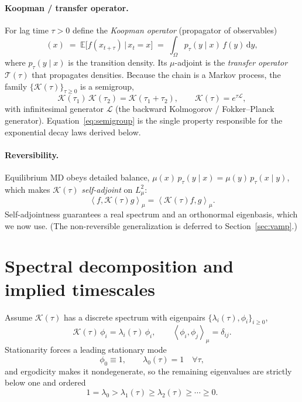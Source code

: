 \documentclass[11pt]{article}
\theoremstyle{plain}
\theoremstyle{definition}
\newcommand{\Kop}{\mathcal{K}}
\newcommand{\Lop}{\mathcal{L}}
\newcommand{\Top}{\mathcal{T}}
\newcommand{\inner}[2]{\left\langle #1 , #2 \right\rangle_{\mu}}
\newcommand{\E}{\mathbb{E}}
\newcommand{\dd}{\,\mathrm{d}}
\begin{document}
\paragraph{Koopman / transfer operator.}
For lag time $\tau>0$ define the \emph{Koopman operator} (propagator of observables)
\begin{equation}
[\Kop(\tau)f](x)\;=\;\E\!\big[f(x_{t+\tau})\,\big|\,x_t=x\big]
\;=\;\int_\Omega p_\tau(y\mid x)\,f(y)\dd y ,
\label{eq:koopman}
\end{equation}
where $p_\tau(y\mid x)$ is the transition density. Its $\mu$-adjoint is the
\emph{transfer operator} $\Top(\tau)$ that propagates densities. Because the chain
is a Markov process, the family $\{\Kop(\tau)\}_{\tau\ge0}$ is a semigroup,
\begin{equation}
\Kop(\tau_1)\,\Kop(\tau_2)=\Kop(\tau_1+\tau_2),
\qquad \Kop(\tau)=e^{\tau\Lop},
\label{eq:semigroup}
\end{equation}
with infinitesimal generator $\Lop$ (the backward Kolmogorov / Fokker--Planck
generator). Equation~\eqref{eq:semigroup} is the single property responsible for the
exponential decay laws derived below.

\paragraph{Reversibility.}
Equilibrium MD obeys detailed balance,
$\mu(x)\,p_\tau(y\mid x)=\mu(y)\,p_\tau(x\mid y)$, which makes $\Kop(\tau)$
\emph{self-adjoint} on $L^2_\mu$:
\begin{equation}
\inner{f}{\Kop(\tau)g}=\inner{\Kop(\tau)f}{g}.
\end{equation}
Self-adjointness guarantees a real spectrum and an orthonormal eigenbasis, which we
now use. (The non-reversible generalization is deferred to
Section~\ref{sec:vamp}.)

\section{Spectral decomposition and implied timescales}

Assume $\Kop(\tau)$ has a discrete spectrum with eigenpairs $\{\lambda_i(\tau),
\phi_i\}_{i\ge0}$,
\begin{equation}
\Kop(\tau)\,\phi_i=\lambda_i(\tau)\,\phi_i ,
\qquad \inner{\phi_i}{\phi_j}=\delta_{ij}.
\end{equation}
Stationarity forces a leading stationary mode
\begin{equation}
\phi_0\equiv 1,\qquad \lambda_0(\tau)=1\quad\forall\tau,
\end{equation}
and ergodicity makes it nondegenerate, so the remaining eigenvalues are strictly
below one and ordered
\begin{equation}
1=\lambda_0>\lambda_1(\tau)\ge\lambda_2(\tau)\ge\cdots\ge 0 .
\end{equation}
\end{document}
